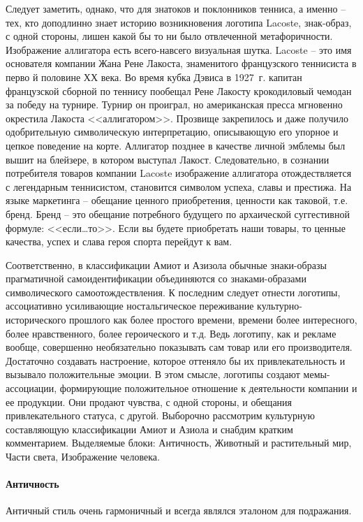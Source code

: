 Следует заметить, однако, что для знатоков и поклонников тенниса, а именно -- тех,
кто доподлинно знает историю возникновения логотипа Lacoste, знак-образ, с одной
стороны, лишен какой бы то ни было отвлеченной метафоричности. Изображение
аллигатора есть всего-навсего визуальная шутка. Lacoste -- это имя основателя
компании Жана Рене Лакоста, знаменитого французского теннисиста в перво
й половине ХХ века. Во время кубка Дэвиса в 1927~г. капитан французской
сборной по теннису пообещал Рене Лакосту крокодиловый чемодан за победу на турнире.
Турнир он проиграл, но американская пресса мгновенно окрестила Лакоста <<аллигатором>>.
Прозвище закрепилось и даже получило одобрительную символическую интерпретацию,
описывающую его упорное и цепкое поведение на корте. Аллигатор позднее в качестве
личной эмблемы был вышит на блейзере, в котором выступал Лакост. Следовательно,
в сознании потребителя товаров компании Lacoste изображение аллигатора
отождествляется с легендарным теннисистом, становится символом успеха, славы и
престижа. На языке маркетинга -- обещание ценного приобретения, ценности как
таковой, т.е. бренд. Бренд -- это обещание потребного будущего по архаической
суггестивной формуле: <<если\ldots то>>. Если вы будете приобретать наши товары,
то ценные качества, успех и слава героя спорта перейдут к вам.

Соответственно, в классификации Амиот и Азизола обычные знаки-образы прагматичной
самоидентификации объединяются со знаками-образами символического
самоотождествления. К последним следует отнести логотипы, ассоциативно усиливающие
ностальгическое переживание культурно-исторического прошлого как более
простого времени, времени более интересного, более нравственного, более
героического и т.д. Ведь логотипу, как и рекламе вообще, совершенно необязательно
показывать сам товар или его производителя. Достаточно создавать настроение,
которое оттеняло бы их привлекательность и вызывало положительные эмоции.
В этом смысле, логотипы создают мемы-ассоциации, формирующие положительное
отношение к деятельности компании и ее продукции. Они продают чувства,
с одной стороны, и обещания привлекательного статуса, с другой. Выборочно
рассмотрим культурную составляющую классификации Амиот и Азиола и снабдим кратким
комментарием. Выделяемые блоки: Античность, Животный и растительный мир, Части света, Изображение человека.

\paragraph{Античность}
Античный стиль очень гармоничный и всегда являлся эталоном для подражания.

